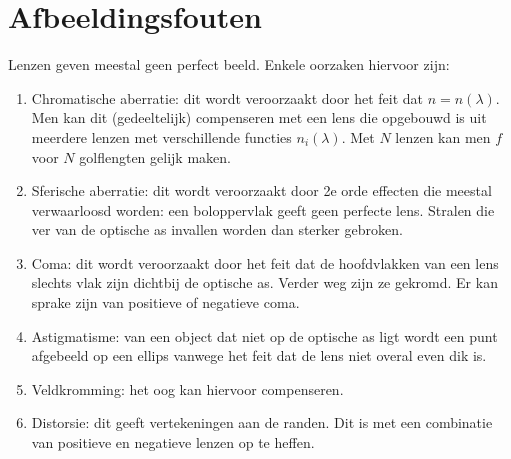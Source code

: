 \documentclass[twoside]{report}
\begin{document}
\section{Afbeeldingsfouten}
Lenzen geven meestal geen perfect beeld. Enkele oorzaken hiervoor zijn:
\begin{enumerate}
\item Chromatische aberratie: dit wordt veroorzaakt door het feit dat
      $n=n(\lambda)$. Men kan dit (gedeeltelijk) compenseren met een lens die
      opgebouwd is uit meerdere lenzen met verschillende functies $n_i(\lambda)$.
      Met $N$ lenzen kan men $f$ voor $N$ golflengten gelijk maken.
\item Sferische aberratie: dit wordt veroorzaakt door 2e orde effecten die
      meestal verwaarloosd worden: een boloppervlak geeft geen perfecte lens.
      Stralen die ver van de optische as invallen worden dan sterker gebroken.
\item Coma: dit wordt veroorzaakt door het feit dat de hoofdvlakken van een
      lens slechts vlak zijn dichtbij de optische as. Verder weg zijn ze
      gekromd. Er kan sprake zijn van positieve of negatieve coma.
\item Astigmatisme: van een object dat niet op de optische as ligt wordt een
      punt afgebeeld op een ellips vanwege het feit dat de lens niet overal
      even dik is.
\item Veldkromming: het oog kan hiervoor compenseren.
\item Distorsie: dit geeft vertekeningen aan de randen. Dit is met een
      combinatie van positieve en negatieve lenzen op te heffen.
\end{enumerate}
\end{document}
